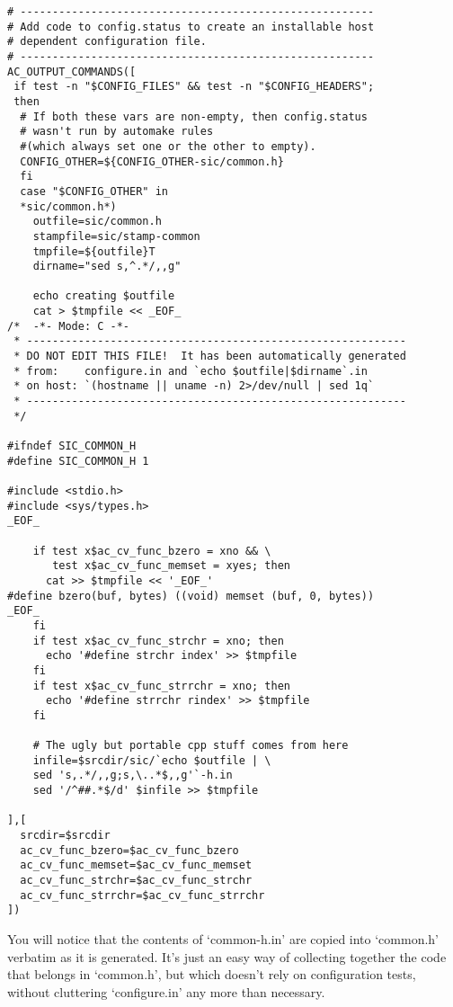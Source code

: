 \begin{Verbatim}[frame=single]
# -------------------------------------------------------
# Add code to config.status to create an installable host 
# dependent configuration file.
# -------------------------------------------------------
AC_OUTPUT_COMMANDS([
 if test -n "$CONFIG_FILES" && test -n "$CONFIG_HEADERS"; 
 then
  # If both these vars are non-empty, then config.status 
  # wasn't run by automake rules 
  #(which always set one or the other to empty).
  CONFIG_OTHER=${CONFIG_OTHER-sic/common.h}
  fi
  case "$CONFIG_OTHER" in
  *sic/common.h*)
    outfile=sic/common.h
    stampfile=sic/stamp-common
    tmpfile=${outfile}T
    dirname="sed s,^.*/,,g"

    echo creating $outfile
    cat > $tmpfile << _EOF_
/*  -*- Mode: C -*-
 * -----------------------------------------------------------
 * DO NOT EDIT THIS FILE!  It has been automatically generated
 * from:    configure.in and `echo $outfile|$dirname`.in
 * on host: `(hostname || uname -n) 2>/dev/null | sed 1q`
 * -----------------------------------------------------------
 */

#ifndef SIC_COMMON_H
#define SIC_COMMON_H 1

#include <stdio.h>
#include <sys/types.h>
_EOF_

    if test x$ac_cv_func_bzero = xno && \
       test x$ac_cv_func_memset = xyes; then
      cat >> $tmpfile << '_EOF_'
#define bzero(buf, bytes) ((void) memset (buf, 0, bytes))
_EOF_
    fi
    if test x$ac_cv_func_strchr = xno; then
      echo '#define strchr index' >> $tmpfile
    fi
    if test x$ac_cv_func_strrchr = xno; then
      echo '#define strrchr rindex' >> $tmpfile
    fi

    # The ugly but portable cpp stuff comes from here
    infile=$srcdir/sic/`echo $outfile | \
    sed 's,.*/,,g;s,\..*$,,g'`-h.in
    sed '/^##.*$/d' $infile >> $tmpfile 

],[
  srcdir=$srcdir
  ac_cv_func_bzero=$ac_cv_func_bzero
  ac_cv_func_memset=$ac_cv_func_memset
  ac_cv_func_strchr=$ac_cv_func_strchr
  ac_cv_func_strrchr=$ac_cv_func_strrchr
])
\end{Verbatim}

You will notice that the contents of `common-h.in' are copied into `common.h' verbatim as it is generated. It's just an easy way of collecting together the code that belongs in `common.h', but which doesn't rely on configuration tests, without cluttering `configure.in' any more than necessary.

